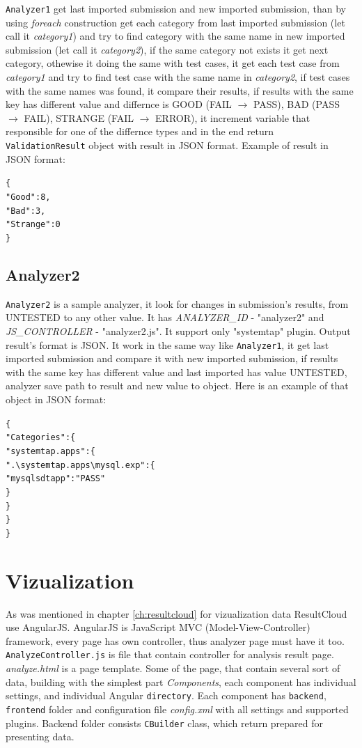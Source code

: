 \texttt{Analyzer1} get last imported submission and new imported submission, than by using \emph{foreach} construction get each category from last imported submission (let call it \emph{category1}) and try to find category with the same name in new imported submission (let call it \emph{category2}), if the same category not exists it get next category, othewise it doing the same with test cases, it get each test case from \emph{category1} and try to find test case with the same name in \emph{category2}, if test cases with the same names was found, it compare their results, if results with the same key has different value and differnce is GOOD (FAIL $\rightarrow$ PASS), BAD (PASS $\rightarrow$ FAIL), STRANGE (FAIL $\rightarrow$ ERROR), it increment variable that responsible for one of the differnce types and in the end return \texttt{ValidationResult} object with result in JSON format. Example of result in JSON format:
\begin{alltt}
\{
    "Good": 8,
    "Bad": 3,
    "Strange": 0
\}
\end{alltt}

\subsection{Analyzer2}

\texttt{Analyzer2} is a sample analyzer, it look for changes in submission's results, from UNTESTED to any other value. It has \emph{ANALYZER\_ID} - "analyzer2" and \emph{JS\_CONTROLLER} - "analyzer2.js". It support only "systemtap" plugin. Output result's format is JSON. It work in the same way like \texttt{Analyzer1}, it get last imported submission and compare it with new imported submission, if results with the same key has different value and last imported has value UNTESTED, analyzer save path to result and new value to object. Here is an example of that object in JSON format:
\begin{alltt}
\{
    "Categories": \{
        "systemtap.apps": \{
            ".\textbackslash{}systemtap.apps\textbackslash{}mysql.exp": \{
                "mysql sdt app": "PASS"
            \}
        \}
    \}
\}
\end{alltt}

\section{Vizualization}

As was mentioned in chapter \ref{ch:resultcloud} for vizualization data ResultCloud use AngularJS. AngularJS is JavaScript MVC (Model-View-Controller) framework, every page has own controller, thus analyzer page must have it too. \texttt{AnalyzeController.js} is file that contain controller for analysis result page. \emph{analyze.html} is a page template. Some of the page, that contain several sort of data, building with the simplest part \emph{Components}, each component has individual settings, and individual Angular \texttt{directory}. Each component has \texttt{backend}, \texttt{frontend} folder and configuration file \emph{config.xml} with all settings and supported plugins. Backend folder consists \texttt{CBuilder} class, which return prepared for presenting data. 

